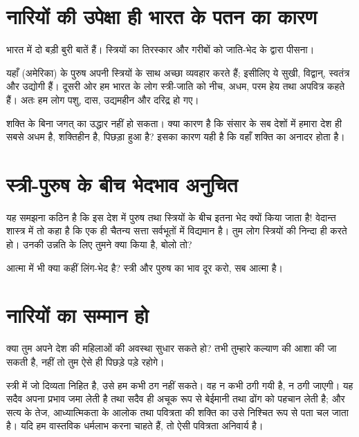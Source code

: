 \section*{नारियों की उपेक्षा ही भारत के पतन का कारण}


भारत में दो बड़ी बुरी बातें हैं। स्त्रियों का तिरस्कार और गरीबों को जाति-भेद के द्वारा पीसना। 

यहाँ (अमेरिका) के पुरुष अपनी स्त्रियों के साथ अच्छा व्यवहार करते हैं; इसीलिए ये सुखी, विद्वान्, स्वतंत्र और उद्योगी हैं। दूसरी ओर हम भारत के लोग स्त्री-जाति को नीच, अधम, परम हेय तथा अपवित्र कहते हैं। अतः हम लोग पशु, दास, उद्यमहीन और दरिद्र हो गए। 

\newpage

शक्ति के बिना जगत् का उद्धार नहीं हो सकता। क्या कारण है कि संसार के सब देशों में हमारा देश ही सबसे अधम है, शक्तिहीन है, पिछड़ा हुआ है? इसका कारण यही है कि वहाँ शक्ति का अनादर होता है।


\section*{स्त्री-पुरुष के बीच भेदभाव अनुचित}


यह समझना कठिन है कि इस देश में पुरुष तथा स्त्रियों के बीच इतना भेद क्यों किया जाता है! वेदान्त शास्त्र में तो कहा है कि एक ही चैतन्य सत्ता सर्वभूतों में विद्यमान है। तुम लोग स्त्रियों की निन्दा ही करते हो। उनकी उन्नति के लिए तुमने क्या किया है, बोलो तो? 

आत्मा में भी क्या कहीं लिंग-भेद है? स्त्री और पुरुष का भाव दूर करो, सब आत्मा है।


\section*{नारियों का सम्मान हो}


क्या तुम अपने देश की महिलाओं की अवस्था सुधार सकते हो? तभी तुम्हारे कल्याण की आशा की जा सकती है, नहीं तो तुम ऐसे ही पिछड़े पड़े रहोगे। 

स्त्री में जो दिव्यता निहित है, उसे हम कभी ठग नहीं सकते। वह न कभी ठगी गयी है, न ठगी जाएगी। यह सदैव अपना प्रभाव जमा लेती है तथा सदैव ही अचूक रूप से बेईमानी तथा ढोंग को पहचान लेती है; और सत्य के तेज, आध्यात्मिकता के आलोक तथा पवित्रता की शक्ति का उसे निश्चित रूप से पता चल जाता है। यदि हम वास्तविक धर्मलाभ करना चाहते हैं, तो ऐसी पवित्रता अनिवार्य है। 

